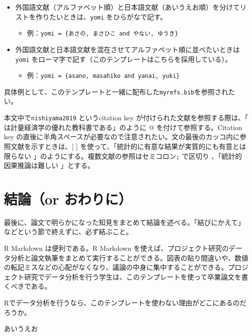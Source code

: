 \documentclass[lualatex,
               a4paper,
               10.5pt,
               ja=standard,
               jafont=ipaex]{bxjsarticle}
\providecommand{\tightlist}{%
  \setlength{\itemsep}{0pt}\setlength{\parskip}{0pt}}
\begin{document}
\begin{itemize}
\tightlist
\item
  外国語文献（アルファベット順）と日本語文献（あいうえお順）を分けてリストを作りたいときは、\texttt{yomi} をひらがなで記す。

  \begin{itemize}
  \tightlist
  \item
    例：\texttt{yomi\ =\ \{あさの,\ まさひこ\ and\ やない,\ ゆうき\}}
  \end{itemize}
\item
  外国語文献と日本語文献を混在させてアルファベット順に並べたいときは \texttt{yomi} をローマ字で記す（このテンプレートはこちらを採用している）。

  \begin{itemize}
  \tightlist
  \item
    例：\texttt{yomi\ =\ \{asano,\ masahiko\ and\ yanai,\ yuki\}}
  \end{itemize}
\end{itemize}

具体例として、このテンプレートと一緒に配布した\texttt{myrefs.bib}を参照されたい。

本文中で\texttt{nishiyama2019} というcitation key が付けられた文献を参照する際は、「\citet{nishiyama2019} は計量経済学の優れた教科書である」のように @ を付けて参照する。Citation key の直後に半角スペースが必要なので注意されたい。文の最後のカッコ内に参照文献を示すときは、{[} {]} を使って、「統計的に有意な結果が実質的にも有意とは限らない \citep[たとえば、][pp.~165-168]{mayy2018}」のようにする。複数文献の参照はセミコロン\texttt{;} で区切り 、「統計的因果推論は難しい \citep{ang2015, cunningham2021}」とする。

\section{結論（or おわりに）}\label{ux7d50ux8ad6or-ux304aux308fux308aux306b}

最後に、論文で明らかになった知見をまとめて結論を述べる。「結びにかえて」などという節で終えずに、必ず結ぶこと。

R Markdown は便利である。R Markdown を使えば、プロジェクト研究のデータ分析と論文執筆をまとめて実行することができる。図表の貼り間違いや、数値の転記ミスなどの心配がなくなり、議論の中身に集中することができる。プロジェクト研究でデータ分析を行う学生は、このテンプレートを使って卒業論文を書くべきである。

Rでデータ分析を行うなら、このテンプレートを使わない理由がどこにあるのだろうか。

あいうえお \citet{moe1984}



\end{document}
